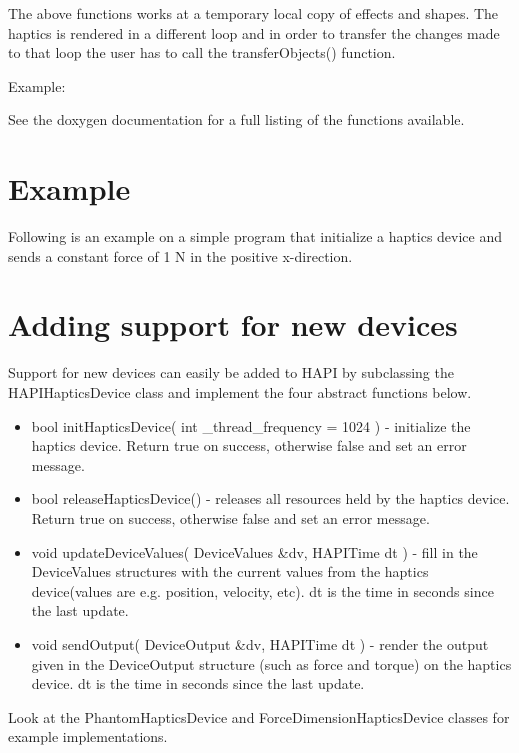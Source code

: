 The above functions works at a temporary local copy of effects and
shapes. The haptics is rendered in a different loop and in order to
transfer the changes made to that loop the user has to call the
{\ttfamily transferObjects()} function. 

Example:



See the doxygen documentation for a full listing of the functions
available. 

\section{Example}
Following is an example on a simple program that initialize a haptics
device and sends a constant force of 1 N in the positive x-direction.

 

\section{Adding support for new devices}
\label{ssAddingHapticsSupport}

Support for new devices can easily be added to HAPI by subclassing the
HAPIHapticsDevice class and implement the four abstract functions below.

\begin{itemize}
\item {\ttfamily bool initHapticsDevice( int \_thread\_frequency = 1024 )} - initialize the haptics device. Return
  true on success, otherwise false and set an error message. 
\item {\ttfamily bool releaseHapticsDevice()} - releases all resources held by the
  haptics device. Return true on success, otherwise false and set an
  error message. 
\item {\ttfamily void updateDeviceValues( DeviceValues \&dv, HAPITime dt ) } - fill
  in the DeviceValues structures with the current values from the
  haptics device(values are e.g. position, velocity, etc). dt is the
  time in seconds since the last update.
\item {\ttfamily void sendOutput( DeviceOutput \&dv, HAPITime dt )} - render the
  output given in the DeviceOutput structure (such as force and torque)
  on the haptics device. dt is the time in seconds since the last update.
\end{itemize}

Look at the PhantomHapticsDevice and ForceDimensionHapticsDevice classes for
example implementations. 

